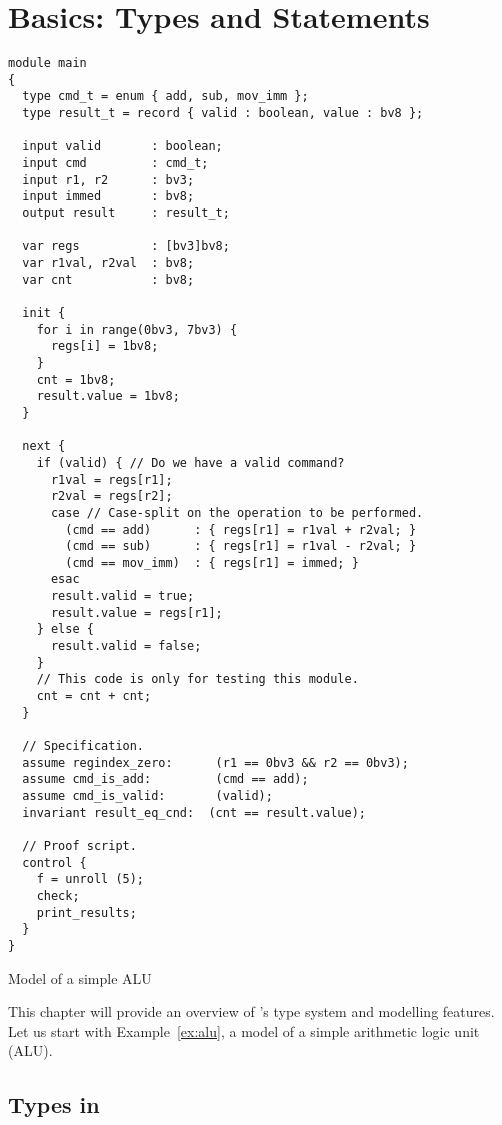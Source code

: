 \chapter{Basics: Types and Statements}
\begin{uclidlisting}[htbp]
\begin{lstlisting}[language=uclid,style=uclidstyle]
module main
{
  type cmd_t = enum { add, sub, mov_imm };
  type result_t = record { valid : boolean, value : bv8 };

  input valid       : boolean;
  input cmd         : cmd_t;
  input r1, r2      : bv3;
  input immed       : bv8;
  output result     : result_t;

  var regs          : [bv3]bv8;
  var r1val, r2val  : bv8;
  var cnt           : bv8; 

  init {
    for i in range(0bv3, 7bv3) {
      regs[i] = 1bv8;
    }
    cnt = 1bv8;
    result.value = 1bv8;
  }

  next {
    if (valid) { // Do we have a valid command?
      r1val = regs[r1];
      r2val = regs[r2];
      case // Case-split on the operation to be performed.
        (cmd == add)      : { regs[r1] = r1val + r2val; }
        (cmd == sub)      : { regs[r1] = r1val - r2val; }
        (cmd == mov_imm)  : { regs[r1] = immed; }
      esac
      result.valid = true;
      result.value = regs[r1];
    } else {
      result.valid = false;
    }
    // This code is only for testing this module.
    cnt = cnt + cnt;
  }

  // Specification.
  assume regindex_zero:      (r1 == 0bv3 && r2 == 0bv3);
  assume cmd_is_add:         (cmd == add);
  assume cmd_is_valid:       (valid);
  invariant result_eq_cnd:  (cnt == result.value);

  // Proof script.
  control {
    f = unroll (5);
    check;
    print_results;
  }
}
\end{lstlisting}
\caption{Model of a simple ALU}
\label{ex:alu}
\end{uclidlisting}

This chapter will provide an overview of \uclid{}'s type system and modelling features. Let us start with Example~\ref{ex:alu}, a model of a simple arithmetic logic unit (ALU). 

\section{Types in \uclid{}}

